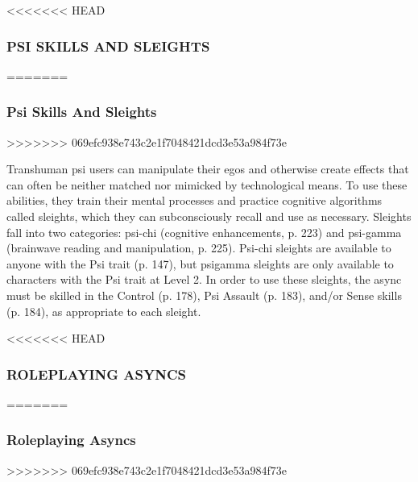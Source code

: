 <<<<<<< HEAD
\subsubsection{PSI SKILLS AND SLEIGHTS}
=======
\subsubsection{Psi Skills And Sleights}
>>>>>>> 069efc938e743c2e1f7048421dcd3e53a984f73e

Transhuman psi users can manipulate their egos and
otherwise create effects that can often be neither
matched nor mimicked by technological means. To use
these abilities, they train their mental processes and
practice cognitive algorithms called sleights, which
they can subconsciously recall and use as necessary.
Sleights fall into two categories: psi-chi (cognitive
enhancements, p. 223) and psi-gamma (brainwave
reading and manipulation, p. 225). Psi-chi sleights are
available to anyone with the Psi trait (p. 147), but psigamma
sleights are only available to characters with
the Psi trait at Level 2. In order to use these sleights,
the async must be skilled in the Control (p. 178), Psi
Assault (p. 183), and/or Sense skills (p. 184), as appropriate
to each sleight.

<<<<<<< HEAD
\subsubsection{ROLEPLAYING ASYNCS}
=======
\subsubsection{Roleplaying Asyncs}
>>>>>>> 069efc938e743c2e1f7048421dcd3e53a984f73e

